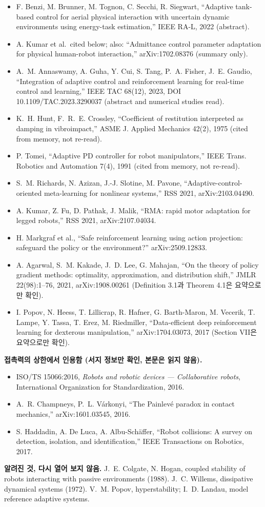\documentclass[11pt]{article}\usepackage[margin=1in]{geometry}\usepackage{amsmath,amssymb,amsthm,mathtools}\usepackage{graphicx}\graphicspath{{figures/}{../figures/}{figs/}{./}}\usepackage{enumitem}\usepackage{hyperref}\usepackage{cleveref}\usepackage{tikz}\usetikzlibrary{arrows.meta,positioning,calc,shapes.geometric}\usepackage{float}\usepackage{rotating}\usepackage[most]{tcolorbox}\usepackage{kotex}\usepackage{booktabs}\usepackage{longtable}\emergencystretch=1.6em\tolerance=2000 \crefname{assumption}{Assumption}{Assumptions}\Crefname{assumption}{Assumption}{Assumptions}\crefname{definition}{Definition}{Definitions}\Crefname{definition}{Definition}{Definitions}\crefname{proposition}{Proposition}{Propositions}\Crefname{proposition}{Proposition}{Propositions}\crefname{fact}{Fact}{Facts}\Crefname{fact}{Fact}{Facts} \newtheorem{assumption}{Assumption}\newtheorem{definition}{Definition}\newtheorem{lemma}{Lemma}\newtheorem{proposition}{Proposition}\newtheorem{theorem}{Theorem}\newtheorem{corollary}{Corollary}\newtheorem{fact}{Fact}\theoremstyle{remark}\newtheorem{remark}{Remark} \newcommand{\R}{\mathbb{R}}\newcommand{\xb}{\bar x}\newcommand{\Ab}{\bar A}\newcommand{\By}{\bar B_y}\newcommand{\U}{\mathcal U}\newcommand{\Z}{\mathcal Z}
\begin{document}
\begin{itemize}
\item F. Benzi, M. Brunner, M. Tognon, C. Secchi, R. Siegwart, ``Adaptive tank-based control for aerial physical interaction with uncertain dynamic environments using energy-task estimation,'' IEEE RA-L, 2022 (abstract).
\item A. Kumar et al.~cited below; also: ``Admittance control parameter adaptation for physical human-robot interaction,'' arXiv:1702.08376 (summary only).
\item A.~M. Annaswamy, A. Guha, Y. Cui, S. Tang, P.~A. Fisher, J.~E. Gaudio, ``Integration of adaptive control and reinforcement learning for real-time control and learning,'' IEEE TAC 68(12), 2023, DOI 10.1109/TAC.2023.3290037 (abstract and numerical studies read).
\item K.~H. Hunt, F.~R.~E. Crossley, ``Coefficient of restitution interpreted as damping in vibroimpact,'' ASME J. Applied Mechanics 42(2), 1975 (cited from memory, not re-read).
\item P. Tomei, ``Adaptive PD controller for robot manipulators,'' IEEE Trans. Robotics and Automation 7(4), 1991 (cited from memory, not re-read).
\item S.~M. Richards, N. Azizan, J.-J. Slotine, M. Pavone, ``Adaptive-control-oriented meta-learning for nonlinear systems,'' RSS 2021, arXiv:2103.04490.
\item A. Kumar, Z. Fu, D. Pathak, J. Malik, ``RMA: rapid motor adaptation for legged robots,'' RSS 2021, arXiv:2107.04034.
\item H. Markgraf et al., ``Safe reinforcement learning using action projection: safeguard the policy or the environment?'' arXiv:2509.12833.
\item A. Agarwal, S.~M. Kakade, J.~D. Lee, G. Mahajan, ``On the theory of policy gradient methods: optimality, approximation, and distribution shift,'' JMLR 22(98):1--76, 2021, arXiv:1908.00261 (Definition 3.1과 Theorem 4.1은 요약으로만 확인).
\item I. Popov, N. Heess, T. Lillicrap, R. Hafner, G. Barth-Maron, M. Vecerik, T. Lampe, Y. Tassa, T. Erez, M. Riedmiller, ``Data-efficient deep reinforcement learning for dexterous manipulation,'' arXiv:1704.03073, 2017 (Section VII은 요약으로만 확인).
\end{itemize}

\textbf{접촉력의 상한에서 인용함 (서지 정보만 확인, 본문은 읽지 않음).}
\begin{itemize}
\item ISO/TS 15066:2016, \emph{Robots and robotic devices --- Collaborative robots}, International Organization for Standardization, 2016.
\item A.~R. Champneys, P.~L. V\'arkonyi, ``The Painlev\'e paradox in contact mechanics,'' arXiv:1601.03545, 2016.
\item S. Haddadin, A. De Luca, A. Albu-Sch\"affer, ``Robot collisions: A survey on detection, isolation, and identification,'' IEEE Transactions on Robotics, 2017.
\end{itemize}

\textbf{알려진 것, 다시 열어 보지 않음.} J.~E. Colgate, N. Hogan, coupled stability of robots interacting with passive environments (1988). J.~C. Willems, dissipative dynamical systems (1972). V.~M. Popov, hyperstability; I.~D. Landau, model reference adaptive systems.
\end{document}
